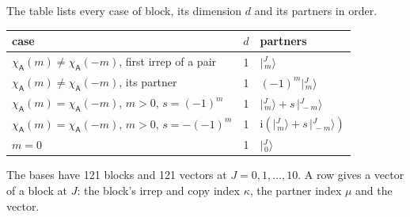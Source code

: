 \documentclass[10pt,a4paper]{article}
\numberwithin{equation}{section}
\newcommand{\grp}[1]{\mathsf{#1}}
\newcommand{\iunit}{\mathrm{i}}
\newcommand{\chiA}{\chi_{\grp{A}}}
\newcommand{\mult}{\kappa}
\newcommand{\intx}{\mu}
\newcommand{\jm}[2]{\bigl\lvert{}^{#1}_{\,#2}\bigr\rangle}
\begin{document}
\leavevmode\label{n:head.case}\label{n:head.partners}The table lists every case of block, its dimension $d$ and its partners in order.
\begin{center}\begin{tabular}{@{}lrl@{}}\toprule
case & $d$ & partners\\\midrule
$\chiA(m) \ne \chiA(-m)$, first irrep of a pair & 1 & $\jm{J}{m}$\\
$\chiA(m) \ne \chiA(-m)$, its partner & 1 & $(-1)^m\jm{J}{m}$\\
$\chiA(m) = \chiA(-m)$, $m > 0$, $s = (-1)^m$ & 1 & $\jm{J}{m} + s\,\jm{J}{-m}$\\
$\chiA(m) = \chiA(-m)$, $m > 0$, $s = -(-1)^m$ & 1 & $\iunit(\jm{J}{m} + s\,\jm{J}{-m})$\\
$m = 0$ & 1 & $\jm{J}{0}$\\
\bottomrule\end{tabular}\end{center}
The bases have 121 blocks and 121 vectors at $J = 0, 1, \dots, 10$. \label{n:index.copy}\label{n:head.vector}A row gives a vector of a block at $J$: the block's irrep and copy index $\mult$, the partner index $\intx$ and the vector.
\end{document}
